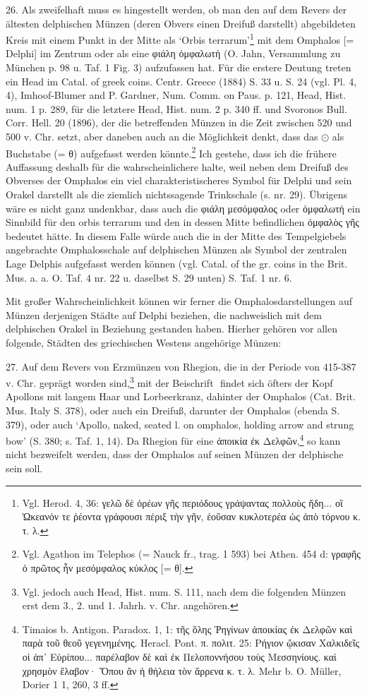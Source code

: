 \documentclass[a4paper, 11pt, oneside]{article}
\newcommand*\svgAAT{}
\begin{document}
26. Als zweifelhaft muss es hingestellt werden, ob man den auf dem Revers der ältesten delphischen Münzen (deren Obvers einen Dreifuß darstellt) abgebildeten Kreis mit einem Punkt in der Mitte als `Orbis terrarum'\footnote{Vgl. Herod. 4, 36: γελῶ δὲ ὁρέων γῆς περιόδους γράψαντας πολλοὺς ἤδη... οἳ Ὠκεανόν τε ῥέοντα γράφουσι πέριξ τὴν γῆν, ἐοῦσαν κυκλοτερέα ὡς ἀπὸ τόρνου κ. τ. λ.} mit dem Omphalos [= Delphi] im Zentrum oder als eine φιάλη ὀμφαλωτή (O. Jahn, Versammlung zu München p. 98 u. Taf. 1 Fig. 3) aufzufassen hat. Für die erstere Deutung treten ein Head im Catal. of greek coins. Centr. Greece (1884) S. 33 u. S. 24 (vgl. Pl. 4, 4), Imhoof-Blumer and P. Gardner, Num. Comm. on Paus. p. 121, Head, Hist. num. 1 p. 289, für die letztere Head, Hist. num. 2 p. 340 ff. und Svoronos Bull. Corr. Hell. 20 (1896), der die betreffenden Münzen in die Zeit zwischen 520 und 500 v. Chr. setzt, aber daneben auch an die Möglichkeit denkt, dass das $\odot$ als Buchstabe (= θ) aufgefasst werden könnte.\footnote{Vgl. Agathon im Telephos (= Nauck fr., trag. 1 593) bei Athen. 454 d: γραφῆς ὁ πρῶτος ἦν μεσόμφαλος κύκλος [= θ].} Ich gestehe, dass ich die frühere Auffassung deshalb für die wahrscheinlichere halte, weil neben dem Dreifuß des Obverses der Omphalos ein viel charakteristischeres Symbol für Delphi und sein Orakel darstellt als die ziemlich nichtssagende Trinkschale (s. nr. 29). Übrigens wäre es nicht ganz undenkbar, dass auch die φιάλη μεσόμφαλος oder ὀμφαλωτή ein Sinnbild für den orbis terrarum und den in dessen Mitte befindlichen ὀμφαλὸς γῆς bedeutet hätte. In diesem Falle würde auch die in der Mitte des Tempelgiebels angebrachte Omphalosschale auf delphischen Münzen als Symbol der zentralen Lage Delphis aufgefasst werden können (vgl. Catal. of the gr. coins in the Brit. Mus. a. a. O. Taf. 4 nr. 22 u. daselbst S. 29 unten) S. Taf. 1 nr. 6.

Mit großer Wahrscheinlichkeit können wir ferner die Omphalosdarstellungen auf Münzen derjenigen Städte auf Delphi beziehen, die nachweislich mit dem delphischen Orakel in Beziehung gestanden haben. Hierher gehören vor allen folgende, Städten des griechischen Westens angehörige Münzen:

27. Auf dem Revers von Erzmünzen von Rhegion, die in der Periode von 415-387 v. Chr. geprägt worden sind,\footnote{Vgl. jedoch auch Head, Hist. num. S. 111, nach dem die folgenden Münzen erst dem 3., 2. und 1. Jahrh. v. Chr. angehören.} mit der Beischrift $\svgAAT$ findet sich öfters der Kopf Apollons mit langem Haar und Lorbeerkranz, dahinter der Omphalos (Cat. Brit. Mus. Italy S. 378), oder auch ein Dreifuß, darunter der Omphalos (ebenda S. 379), oder auch `Apollo, naked, seated l. on omphalos, holding arrow and strung bow' (S. 380; s. Taf. 1, 14). Da Rhegion für eine ἀποικία ἐκ Δελφῶν,\footnote{Timaios b. Antigon. Paradox. 1, 1: τῆς ὅλης Ῥηγίνων ἀποικίας ἐκ Δελφῶν καὶ παρὰ τοῦ θεοῦ γεγενημένης. Heracl. Pont. π. πολιτ. 25: Ρήγιον ᾤκισαν Χαλκιδεῖς οἱ ἀπ᾿ Εὐρίπου... παρέλαβον δὲ καὶ ἐκ Πελοποννήσου τοὺς Μεσσηνίους. καὶ χρησμὸν ἔλαβον· Ὅπου ἂν ἡ θήλεια τὸν ἄρρενα κ. τ. λ. Mehr b. O. Müller, Dorier 1 1, 260, 3 ff.} so kann nicht bezweifelt werden, dass der Omphalos auf seinen Münzen der delphische sein soll.
\end{document}
